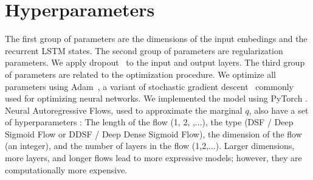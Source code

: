 \documentclass[entropy,article,submit,moreauthors,pdftex,10pt,a4paper]{Definitions/mdpi}
\begin{document}

\appendix
\section{Hyperparameters}

The first group of parameters are the dimensions of the input embedings and the recurrent LSTM states.
The second group of parameters are regularization parameters.
We apply dropout~\citep{srivastava-dropout:-2014} to the input and output layers.
The third group of parameters are related to the optimization procedure.
We optimize all parameters using Adam~\citep{kingma-adam:-2014}, a variant of stochastic gradient descent~\citep{robbins1951stochastic} commonly used for optimizing neural networks.
We implemented the model using PyTorch \citep{paszke2017automatic}.
Neural Autoregressive Flows, used to approximate the marginal $q$, also have a set of hyperparameters \citep{huang-neural-2018}: The length of the flow (1, 2, ,...), the type (DSF / Deep Sigmoid Flow or  DDSF / Deep Dense Sigmoid Flow), the dimension of the flow (an integer), and the number of layers in the flow (1,2,...).
Larger dimensions, more layers, and longer flows lead to more expressive models; however, they are computationally more expensive.
\end{document}
